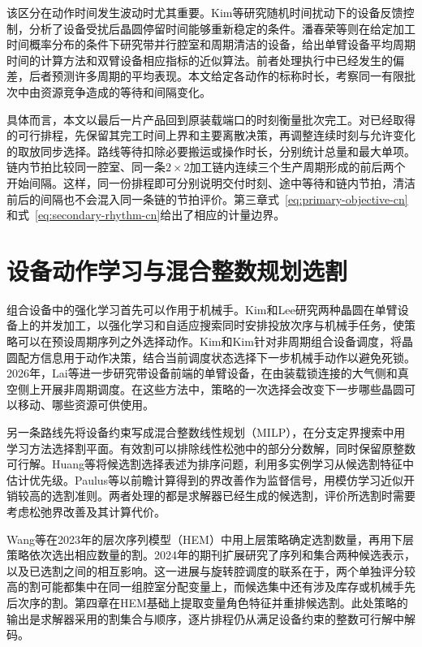 该区分在动作时间发生波动时尤其重要。Kim等研究随机时间扰动下的设备反馈控制，分析了设备受扰后晶圆停留时间能够重新稳定的条件\citep{kim2022feedback}。潘春荣等则在给定加工时间概率分布的条件下研究带并行腔室和周期清洁的设备，给出单臂设备平均周期时间的计算方法和双臂设备相应指标的近似算法\citep{pan2024variation}。前者处理执行中已经发生的偏差，后者预测许多周期的平均表现。本文给定各动作的标称时长，考察同一有限批次中由资源竞争造成的等待和间隔变化。

具体而言，本文以最后一片产品回到原装载端口的时刻衡量批次完工。对已经取得的可行排程，先保留其完工时间上界和主要离散决策，再调整连续时刻与允许变化的取放同步选择。路线等待扣除必要搬运或操作时长，分别统计总量和最大单项。链内节拍比较同一腔室、同一条$2\times2$加工链内连续三个生产周期形成的前后两个开始间隔。这样，同一份排程即可分别说明交付时刻、途中等待和链内节拍，清洁前后的间隔也不会混入同一条链的节拍评价。第三章式~\eqref{eq:primary-objective-cn}和式~\eqref{eq:secondary-rhythm-cn}给出了相应的计量边界。

\section{设备动作学习与混合整数规划选割}

组合设备中的强化学习首先可以作用于机械手。Kim和Lee研究两种晶圆在单臂设备上的并发加工，以强化学习和自适应搜索同时安排投放次序与机械手任务，使策略可以在预设周期序列之外选择动作\citep{kim2025adaptivecluster}。Kim和Kim针对非周期组合设备调度，将晶圆配方信息用于动作决策，结合当前调度状态选择下一步机械手动作以避免死锁\citep{kim2025noncyclicdeadlock}。2026年，Lai等进一步研究带设备前端的单臂设备，在由装载锁连接的大气侧和真空侧上开展非周期调度\citep{lai2026front}。在这些方法中，策略的一次选择会改变下一步哪些晶圆可以移动、哪些资源可供使用。

另一条路线先将设备约束写成混合整数线性规划（MILP），在分支定界搜索中用学习方法选择割平面。有效割可以排除线性松弛中的部分分数解，同时保留原整数可行解。Huang等将候选割选择表述为排序问题，利用多实例学习从候选割特征中估计优先级\citep{huang2022cutranking}。Paulus等以前瞻计算得到的界改善作为监督信号，用模仿学习近似开销较高的选割准则\citep{paulus2022looking}。两者处理的都是求解器已经生成的候选割，评价所选割时需要考虑松弛界改善及其计算代价。

Wang等在2023年的层次序列模型（HEM）中用上层策略确定选割数量，再用下层策略依次选出相应数量的割。2024年的期刊扩展研究了序列和集合两种候选表示，以及已选割之间的相互影响\citep{wang2023hem,wang2024hemset}。这一进展与旋转腔调度的联系在于，两个单独评分较高的割可能都集中在同一组腔室分配变量上，而候选集中还有涉及库存或机械手先后次序的割。第四章在HEM基础上提取变量角色特征并重排候选割。此处策略的输出是求解器采用的割集合与顺序，逐片排程仍从满足设备约束的整数可行解中解码。

